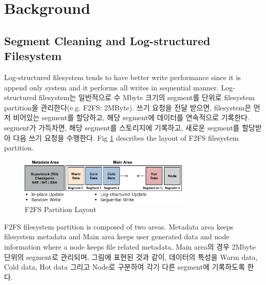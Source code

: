 \documentclass[letterpaper,twocolumn,10pt]{article}
\begin{document}
\section{Background}

\subsection{Segment Cleaning and Log-structured Filesystem}

Log-structured filesystem tends to have better write performance since it is append only system and it performs all writes in sequential manner. Log-structured filesystem는 일반적으로 수 Mbyte 크기의 segment를 단위로 filesystem partition을 관리한다(e.g. F2FS: 2MByte). 쓰기 요청을 전달 받으면, filesystem은 먼저 비어있는 segment를 할당하고, 해당 segment에 데이터를 연속적으로 기록한다. segment가 가득차면, 해당 segment를 스토리지에 기록하고, 새로운 segment를 할당받아 다음 쓰기 요청을 수행한다. Fig \ref{fig:f2fs_layout} describes the layout of F2FS filesystem partition.

\begin{figure}[h]
\begin{center}
\includegraphics[width=3.2in]{./figure/f2fs_layout}
\caption{F2FS Partition Layout}
\label{fig:f2fs_layout}
\end{center}
\end{figure}

F2FS filesystem partition is composed of two areas. Metadata area keeps filesystem metadata and Main area keeps user generated data and node information where a node keeps file related metadata. Main area의 경우 2Mbyte 단위의 segment로 관리되며, 그림에 표현된 것과 같이, 데이터의 특성을 Warm data, Cold data, Hot data 그리고 Node로 구분하여 각기 다른 segment에 기록하도록 한다.
\end{document}
